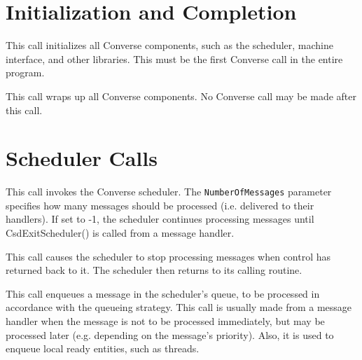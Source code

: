 \chapter{Initialization and Completion}


This call initializes all Converse components, such as the scheduler,
machine interface, and other libraries. This must be the first Converse
call in the entire program.


This call wraps up all Converse components. No Converse call may be made
after this call.




\chapter{Scheduler Calls}



This call invokes the Converse scheduler. The {\tt NumberOfMessages}
parameter specifies how many messages should be processed (i.e. delivered
to their handlers). If set to -1, the scheduler continues processing
messages until CsdExitScheduler() is called from a message handler.

This call causes the scheduler
to stop processing messages when control has returned back to it.
The scheduler then returns to its calling routine.

This call enqueues a message in the scheduler's queue, to be processed
in accordance with the queueing strategy. This call is usually made from
a message handler when the message is not to be processed immediately,
but may be processed later (e.g. depending on the message's priority).
Also, it is used to enqueue local ready entities, such as threads.
